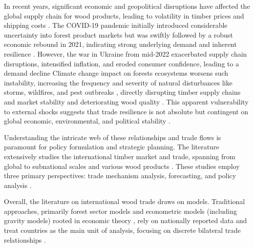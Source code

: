\documentclass[
  authoryear,
  review,
  3p]{elsarticle}
\begin{document}
In recent years, significant economic and geopolitical disruptions have
affected the global supply chain for wood products, leading to
volatility in timber prices and shipping costs
\citep{fao_global_2024, unecefao_forest_2022}. The COVID-19 pandemic
initially introduced considerable uncertainty into forest product
markets but was swiftly followed by a robust economic rebound in 2021,
indicating strong underlying demand and inherent resilience
\citep{unecefao_forest_2022}. However, the war in Ukraine from mid-2022
exacerbated supply chain disruptions, intensified inflation, and eroded
consumer confidence, leading to a demand decline
\citep{unecefao_forest_2022} Climate change impact on forests ecosystems
worsens such instability, increasing the frequency and severity of
natural disturbances like storms, wildfires, and pest outbreaks
\citep{seidl_unraveling_2011, seidl_climate_2017, curtis_classifying_2018, tyukavina_global_2022, patacca_significant_2023},
directly disrupting timber supply chains and market stability and
deteriorating wood quality \citep{garcia-jacome_forest_2025}. This
apparent vulnerability to external shocks suggests that trade resilience
is not absolute but contingent on global economic, environmental, and
political stability
\citep{garcia-jacome_forest_2025, ma_modelling_2025}.

Understanding the intricate web of these relationships and trade flows
is paramount for policy formulation and strategic planning. The
literature extensively studies the international timber market and
trade, spanning from global to subnational scales and various wood
products \citep[\emph{e.g.},][
\citet{shen_structural_2022}]{muller_longterm_2004, raunikar_global_2010, caurla_stimulating_2013, van_kooten_global_2014, buongiorno_global_2015, rougieux_modelling_2017, rougieux_impacts_2021}.
These studies employ three primary perspectives: trade mechanism
analysis, forecasting, and policy analysis
\citep{buongiorno_gravity_2016, riviere_representations_2020, mathieu_meta-analysis_2023}.

Overall, the literature on international wood trade draws on models.
Traditional approaches, primarily forest sector models and econometric
models (including gravity models) rooted in economic theory
\citep{buongiorno_forest_1996, kallio_global_2004, latta_review_2013, northway_forest_2013, buongiorno_global_2015},
rely on nationally reported data and treat countries as the main unit of
analysis, focusing on discrete bilateral trade relationships
\citep{amador_networks_2017, shen_structural_2022}.
\end{document}
